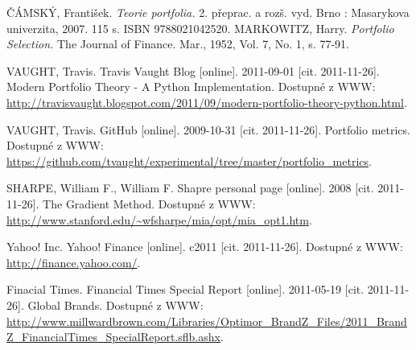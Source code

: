 \documentclass[12pt,a4paper]{report}
\begin{document}
\renewcommand{\bibname}{Seznam použité literatury}
\begin{thebibliography}{9}
\thispagestyle{plain}
 ČÁMSKÝ, František. \emph{Teorie portfolia.} 2. přeprac. a rozš. vyd. Brno : Masarykova univerzita, 2007. 115 s. ISBN 9788021042520.
 MARKOWITZ, Harry. \emph{Portfolio Selection.} The Journal of Finance. Mar., 1952, Vol. 7, No. 1, s. 77-91. 

VAUGHT, Travis. Travis Vaught Blog [online]. 2011-09-01 [cit. 2011-11-26]. Modern Portfolio Theory - A Python Implementation. Dostupné z WWW: \url{http://travisvaught.blogspot.com/2011/09/modern-portfolio-theory-python.html}.

VAUGHT, Travis. GitHub [online]. 2009-10-31 [cit. 2011-11-26]. Portfolio metrics. Dostupné z WWW: \url{https://github.com/tvaught/experimental/tree/master/portfolio_metrics}.

SHARPE, William F., William F. Shapre personal page [online]. 2008 [cit. 2011-11-26]. The Gradient Method. Dostupné z WWW: \url{http://www.stanford.edu/~wfsharpe/mia/opt/mia_opt1.htm}.

Yahoo! Inc. Yahoo! Finance [online]. c2011 [cit. 2011-11-26]. Dostupné z WWW: \url{http://finance.yahoo.com/}.

Finacial Times. Financial Times Special Report [online]. 2011-05-19 [cit. 2011-11-26]. Global Brands. Dostupné z WWW: \url{http://www.millwardbrown.com/Libraries/Optimor_BrandZ_Files/2011_BrandZ_FinancialTimes_SpecialReport.sflb.ashx}.
\end{thebibliography}
\end{document}
